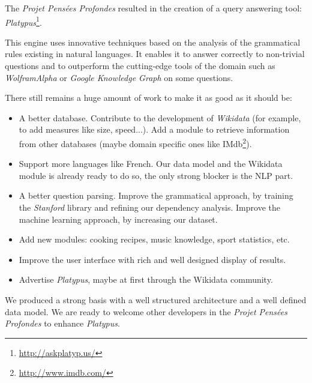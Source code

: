 The \emph{Projet Pensées Profondes} resulted in the creation of a query answering tool: \emph{Platypus}\footnote{\url{http://askplatyp.us/}}.

This engine uses innovative techniques based on the analysis of the grammatical rules existing in natural languages. It enables it to answer correctly to non-trivial questions and to outperform the cutting-edge tools of the domain such as \emph{WolframAlpha} or \emph{Google Knowledge Graph} on some questions.

There still remains a huge amount of work to make it as good as it should be:
\begin{itemize}
    \item A better database. Contribute to the development of \emph{Wikidata} (for example, to add measures like size, speed...). Add a module to retrieve information from other databases (maybe domain specific ones like IMdb\footnote{\url{http://www.imdb.com/}}).
    \item Support more languages like French. Our data model and the Wikidata module is already ready to do so, the only strong blocker is the NLP part.
    \item A better question parsing. Improve the grammatical approach, by training the \emph{Stanford} library and refining our dependency analysis. Improve the machine learning approach, by increasing our dataset.
    \item Add new modules: cooking recipes, music knowledge, sport statistics, etc.
    \item Improve the user interface with rich and well designed display of results.
    \item Advertise \emph{Platypus}, maybe at first through the Wikidata community.
\end{itemize}

We produced a strong basis with a well structured architecture and a well defined data model. We are ready to welcome other developers in the \emph{Projet Pensées Profondes} to enhance \emph{Platypus}.
